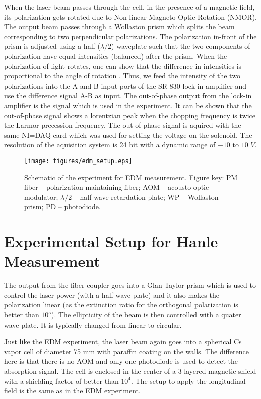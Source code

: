 When the laser beam passes through the cell, in the presence of a magnetic field, its polarization gets rotated due to Non-linear Magneto Optic Rotation (NMOR). The output beam passes through a Wollaston prism which splits the beam corresponding to two perpendicular polarizations. The polarization in-front of the prism is adjusted using a half ($\lambda/2$) waveplate such that the two components of polarization have equal intensities (balanced) after the prism. When the polarization of light rotates, one can show that the difference in intensities is proportional to the angle of rotation \cite{BGK02}. Thus, we feed the intensity of the two polarizations into the A and B input ports of the SR 830 lock-in amplifier and use the difference signal A-B as input. The out-of-phase output from the lock-in amplifier is the signal which is used in the experiment. It can be shown that the out-of-phase signal shows a lorentzian peak when the chopping frequency is twice the Larmor precession frequency. The out-of-phase signal is aquired with the same NI=DAQ card which was used for setting the voltage on the solenoid. The resolution of the aquisition system is 24 bit with a dynamic range of $-10$ to $10$ $V$.



\begin{figure}[ht]
\centering
\texttt{[image: figures/edm\_setup.eps]}
\caption{Schematic of the experiment for EDM measurement. Figure key: PM fiber -- polarization maintaining fiber; AOM -- acousto-optic modulator; $\lambda/2 $ -- half-wave retardation plate; WP -- Wollaston prism; PD -- photodiode.}
\label{fig:edm_setup}
\end{figure}

\section{Experimental Setup for Hanle Measurement}

The output from the fiber coupler goes into a Glan-Taylor prism which is used to control the laser power (with a half-wave plate) and it also makes the polarization linear (as the extinction ratio for the orthogonal polarization is better than $10^5$). The ellipticity of the beam is then controlled with a quater wave plate. It is typically changed from linear to circular.

Just like the EDM experiment, the laser beam again goes into a spherical Cs vapor cell of diameter 75 mm with paraffin coating on the walls. The difference here is that there is no AOM and only one photodiode is used to detect the absorption signal. The cell is enclosed in the center of a 3-layered magnetic shield with a shielding factor of better than $10^4$. The setup to apply the longitudinal field is the same as in the EDM experiment.

